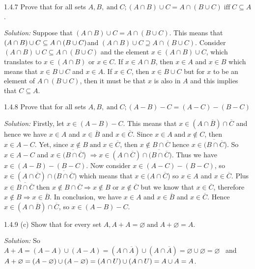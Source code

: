 \documentclass{letter}
\newcommand{\nin}{\not\in}
\newcommand{\tmop}[1]{\ensuremath{\operatorname{#1}}}
\newcommand{\tmtextit}[1]{{\itshape{#1}}}
\begin{document}
1.4.7 Prove that for all sets $A, B, \tmop{and} C ; (A \cap B) \cup C = A \cap
(B \cup C) \tmop{iff} C \subseteq A$.

\tmtextit{Solution:} Suppose that $(A \cap B) \cup C = A \cap (B \cup C)$.
This means that $(A \cap B) \cup C \subseteq A \cap (B \cup C) \\
$and $(A \cap B) \cup C \supseteq A \cap (B \cup C)$. Consider $(A \cap B)
\cup C \subseteq A \cap (B \cup C)$ and the element $x \in (A \cap B) \cup C$,
which translates to $x \in (A \cap B)$ or $x \in C$. If $x \in A \cap B$, then
$x \in A$ and $x \in B$ which means that $x \in B \cup C$ and $x \in A$. If $x
\in C$, then $x \in B \cup C$ but for $x$ to be an element of $A \cap (B \cup
C)$, then it must be that $x$ is also in $A$ and this implies that $C
\subseteq A$.

1.4.8 Prove that for all sets $A, B, \tmop{and} C ; (A - B) - C = (A - C) -
(B - C)$

\tmtextit{Solution:} Firstly, let $x \in (A - B) - C$. This means that $x \in
(A \cap \overline{B}) \cap \overline{C} $ and hence we have $x \in A$ and $x
\in \overline{B}$ and $x \in \overline{C}$. Since $x \in A \tmop{and} x \nin
C$, then $x \in A - C$. Yet, since $x \nin B \tmop{and} x \in \overline{C}$,
then $x \nin B \cap \overline{C}$ hence $x \in \overline{(B \cap \overline{C}}
$). So $x \in A - C$ and $x \in \overline{(B \cap \overline{C}} $)
$\Rightarrow x \in (A \cap \overline{C}) \cap \text{$\overline{(B \cap
\overline{C}} $)}$. Thus we have $x \in (A - B) - (B - C)$. Now consider $x
\in (A - C) - (B - C)$, so $x \in (A \cap \overline{C}) \cap \overline{(B \cap
\overline{C}})$ which means that $x \in (A \cap \overline{C}$) so $x \in A$
and $x \in \overline{C}$. Plus $x \in \overline{B \cap \overline{C}}$ then $x
\nin B \cap \overline{C} \Rightarrow x \nin B$ or $x \nin \overline{C}$ but we
know that $x \in \overline{C}$, therefore $x \nin B \Rightarrow x \in
\overline{B}$. In conclusion, we have $x \in A$ and $x \in \overline{B}$ and
$x \in \overline{C}$. Hence $x \in (A \cap \overline{B}) \cap \overline{C}$,
so $x \in (A - B) - C$.

1.4.9 (c) Show that for every set $A, A + A = \varnothing \tmop{and} A +
\varnothing = A$.

\tmtextit{Solution:} So $A + A = (A - A) \cup (A - A) = (A \cap \overline{A})
\cup (A \cap \overline{A}) = \varnothing \cup \varnothing = \varnothing$ \ and
$\\
A + \varnothing = (A - \varnothing) \cup (A - \varnothing) = (A \cap U) \cup
(A \cap U) = A \cup A = A$.
\end{document}
